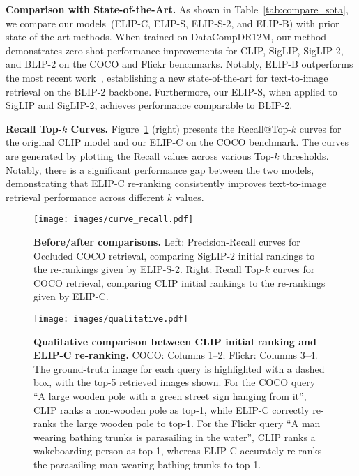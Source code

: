 \vspace{2pt} \noindent \textbf{Comparison with State-of-the-Art.}
As shown in Table~\ref{tab:compare_sota}, we compare our models~(ELIP-C, ELIP-S, ELIP-S-2, and ELIP-B) with prior state-of-the-art methods. When trained on DataCompDR12M, our method demonstrates zero-shot performance improvements for CLIP, SigLIP, SigLIP-2, and BLIP-2 on the COCO and Flickr benchmarks. Notably, ELIP-B outperforms the most recent work~\cite{sogi2024object}, establishing a new state-of-the-art for text-to-image retrieval on the BLIP-2 backbone. Furthermore, our ELIP-S, when applied to SigLIP and SigLIP-2, achieves performance comparable to BLIP-2. 



\vspace{2pt}
\noindent \textbf{Recall Top-$k$ Curves.}
Figure~\ref{fig:curve_recall} (right) presents the Recall@Top-$k$ curves for the original CLIP model and our ELIP-C on the COCO benchmark. The curves are generated by plotting the Recall values across various Top-$k$ thresholds. Notably, there is a significant performance gap between the two models, demonstrating that ELIP-C re-ranking consistently improves text-to-image retrieval performance across different $k$ values.


\begin{figure}[t]
\centering
\texttt{[image: images/curve\_recall.pdf]}
\vspace{-7mm}
\caption{
\textbf{Before/after comparisons.} Left: Precision-Recall curves for  Occluded COCO retrieval, comparing SigLIP-2 initial rankings to the re-rankings given by ELIP-S-2. Right:  Recall Top-$k$ curves for COCO retrieval, comparing  CLIP initial rankings to the re-rankings given by ELIP-C. 
} 
\label{fig:curve_recall}
\end{figure}

\begin{figure}[t]
\centering
\texttt{[image: images/qualitative.pdf]}
\vspace{-4mm}
\caption{
\textbf{Qualitative comparison between CLIP initial ranking and ELIP-C re-ranking.} COCO: Columns 1–2; Flickr: Columns 3–4. 
The ground-truth image for each query is highlighted with a dashed box, with the top-5 retrieved images shown. For the COCO query ``A large wooden pole with a green street sign hanging from it'', CLIP ranks a non-wooden pole as top-1, while ELIP-C correctly re-ranks the large wooden pole to top-1. For the Flickr query ``A man wearing bathing trunks is parasailing in the water'', CLIP ranks a wakeboarding person as top-1, whereas ELIP-C accurately re-ranks the parasailing man wearing bathing trunks to top-1.} 
\label{fig:qualitative}
\vspace{-4mm}
\end{figure}

